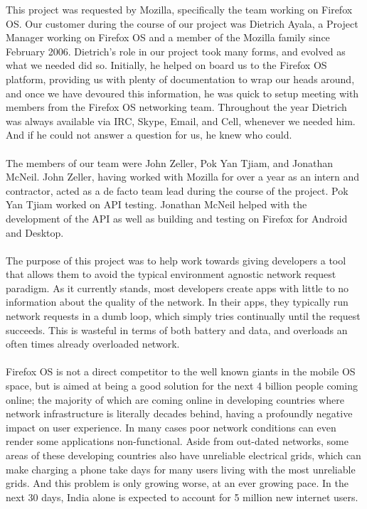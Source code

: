 \documentclass[12pt]{article}
\begin{document}
This project was requested by Mozilla, specifically the team working on Firefox OS. Our customer during the course of our project was Dietrich Ayala, a Project Manager working on Firefox OS and a member of the Mozilla family since February 2006. Dietrich's role in our project took many forms, and evolved as what we needed did so. Initially, he helped on board us to the Firefox OS platform, providing us with plenty of documentation to wrap our heads around, and once we have devoured this information, he was quick to setup meeting with members from the Firefox OS networking team. Throughout the year Dietrich was always available via IRC, Skype, Email, and Cell, whenever we needed him. And if he could not answer a question for us, he knew who could.
\\\\
The members of our team were John Zeller, Pok Yan Tjiam, and Jonathan McNeil. John Zeller, having worked with Mozilla for over a year as an intern and contractor, acted as a de facto team lead during the course of the project. Pok Yan Tjiam worked on API testing. Jonathan McNeil helped with the development of the API as well as building and testing on Firefox for Android and Desktop.
\\\\
The purpose of this project was to help work towards giving developers a tool that allows them to avoid the typical environment agnostic network request paradigm. As it currently stands, most developers create apps with little to no information about the quality of the network. In their apps, they typically run network requests in a dumb loop, which simply tries continually until the request succeeds. This is wasteful in terms of both battery and data, and overloads an often times already overloaded network.
\\\\
Firefox OS is not a direct competitor to the well known giants in the mobile OS space, but is aimed at being a good solution for the next 4 billion people coming online; the majority of which are coming online in developing countries where network infrastructure is literally decades behind, having a profoundly negative impact on user experience. In many cases poor network conditions can even render some applications non-functional. Aside from out-dated networks, some areas of these developing countries also have unreliable electrical grids, which can make charging a phone take days for many users living with the most unreliable grids. And this problem is only growing worse, at an ever growing pace. In the next 30 days, India alone is expected to account for 5 million new internet users.
\pagebreak
\end{document}
